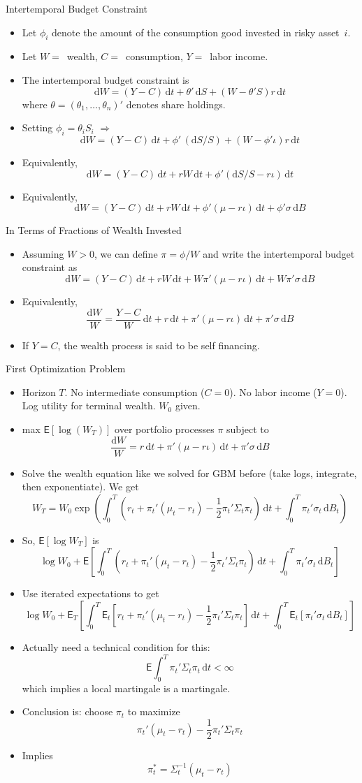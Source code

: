 \documentclass[10pt]{beamer}
\newcommand{\bi}{\begin{itemize}}
\newcommand{\ei}{\end{itemize}}
\newcommand{\im}{\item}
\newcommand{\D}{\mathrm{d}}
\newcommand{\mye}{\ensuremath{\mathsf{E}}}
\begin{document}
\begin{frame}{Intertemporal Budget Constraint}
\bi 
\im 
Let $\phi_i$ denote the amount of the consumption good invested in risky asset~$i$.
\im Let $W=\,$ wealth, $C=\,$ consumption, $Y=\,$ labor income.
 \im The intertemporal budget constraint is
$$\D W = (Y-C)\,\D t + \theta'\,\D S + (W-\theta'S)r\,\D t$$
where $\theta=(\theta_1,\ldots,\theta_n)'$ denotes share holdings.
\im Setting $\phi_i = \theta_iS_i$ $\Rightarrow$
$$\D W = (Y-C)\,\D t + \phi'\,(\D S/S) + (W-\phi'\iota)r\,\D t$$
\im Equivalently,
$$\D W = (Y-C)\,\D t + rW\,\D t + \phi'(\D S/S - r\iota)\,\D t$$
\im Equivalently,
$$\D W = (Y-C)\,\D t + rW\,\D t+\phi'(\mu-r\iota)\,\D t + \phi'\sigma\,\D B$$
\ei
\end{frame}

\begin{frame}{In Terms of Fractions of Wealth Invested}
    \bi 
    \im 
 Assuming $W>0$, we can define $\pi=\phi/W$ and write the intertemporal budget constraint as
$$\D W = (Y-C)\,\D t + rW\,\D t+W\pi'(\mu-r\iota)\,\D t + W\pi'\sigma\,\D B$$
\im Equivalently,
$$\frac{\D W}{W} = \frac{Y-C}{W}\,\D t + r\,\D t+\pi'(\mu-r\iota)\,\D t + \pi'\sigma\,\D B$$
\im If $Y=C$, the wealth process is said to be self financing.
\ei
\end{frame}

\begin{frame}{First Optimization Problem}
\bi 
\im Horizon $T$.  No intermediate consumption ($C=0$).  No labor income ($Y=0$).  Log utility for terminal wealth. $W_0$ given.
\im max $\mye[\log (W_T)]$ over portfolio processes $\pi$ subject to 
$$\frac{\D W}{W} =  r\,\D t+\pi'(\mu-r\iota)\,\D t + \pi'\sigma\,\D B$$
\im Solve the wealth equation like we solved for GBM before (take logs, integrate, then exponentiate).  We get
$$W_T = W_0 \exp \left(\int_0^T \left(r_t + \pi_t'(\mu_t-r_t) - \frac{1}{2}\pi_t'\Sigma_t \pi_t\right)\,\D t  + \int_0^T \pi_t'\sigma_t\,\D B_t \right)$$
\im So, $\mye[\log W_T]$ is
$$\log W_0 + \mye \left[\int_0^T \left(r_t + \pi_t'(\mu_t-r_t) - \frac{1}{2}\pi_t'\Sigma_t \pi_t\right)\,\D t  + \int_0^T \pi_t'\sigma_t\,\D B_t\right]$$
\ei
\end{frame}


\begin{frame}[plain]
    \bi 
    \im Use iterated expectations to get
    $$\log W_0 + \mye_T \left[\int_0^T \mye_t \left[r_t + \pi_t'(\mu_t-r_t) - \frac{1}{2}\pi_t'\Sigma_t \pi_t\right]\,\D t  + \int_0^T \mye_t[\pi_t'\sigma_t\,\D B_t]\right]$$
    \im Actually need a technical condition for this:
    $$\mye \int_0^T \pi_t'\Sigma_t \pi_t\,\D t < \infty$$
    which implies a local martingale is a martingale.
    \im Conclusion is: choose $\pi_t$ to maximize
    $$\pi_t'(\mu_t-r_t) - \frac{1}{2}\pi_t'\Sigma_t \pi_t
    $$ 
    \im Implies
    $$\pi^*_t = \Sigma_t^{-1}(\mu_t - r_t)$$
    \ei 
\end{frame}
\end{document}
